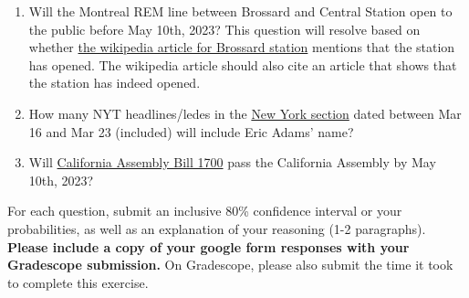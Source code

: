 \documentclass[11pt]{article}
\begin{document}
\begin{enumerate}
	\item Will the Montreal REM line between Brossard and Central Station open to the public before May 10th, 2023? This question will resolve based on whether \href{https://en.wikipedia.org/wiki/Brossard_station}{the wikipedia article for Brossard station} mentions that the station has opened. The wikipedia article should also cite an article that shows that the station has indeed opened.
	\item How many NYT headlines/ledes in the \href{https://www.nytimes.com/section/nyregion}{New York section} dated between Mar 16 and Mar 23 (included) will include Eric Adams' name? 
	\item Will \href{https://leginfo.legislature.ca.gov/faces/billNavClient.xhtml?bill_id=202320240AB1700}{California Assembly Bill 1700} pass the California Assembly by May 10th, 2023?
\end{enumerate}

For each question, submit an inclusive 80\% confidence interval or your probabilities, as well as an explanation of your reasoning (1-2 paragraphs). \textbf{Please include a copy of your google form responses with your Gradescope submission.} On Gradescope, please also submit the time it took to complete this exercise.
\end{document}
